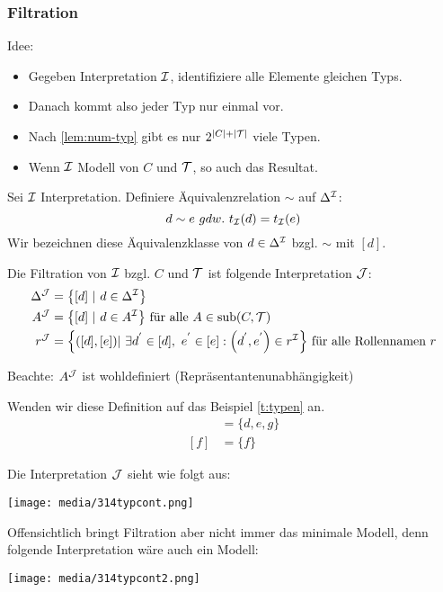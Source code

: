 \subsubsection{Filtration}\label{filtration}
Idee:

\begin{itemize}
  \item Gegeben Interpretation $\mathcal{I}$, identifiziere alle Elemente gleichen Typs.
  \item Danach kommt also jeder Typ nur einmal vor.
  \item Nach \autoref{lem:num-typ} gibt es nur $2^{|C|+|\mathcal{T}|}$ viele Typen.
  \item Wenn $\mathcal{I}$ Modell von $C$ und $\mathcal{T}$, so auch das Resultat.
\end{itemize}

\begin{definition}[Filtration]

Sei $\mathcal{I}$ Interpretation. Definiere Äquivalenzrelation $\sim$ auf
$\Delta^{\mathcal{I}}$: $$d \sim e\ gdw.\ t_\MI\left( d \right) = t_\MI\left( e \right)$$
Wir bezeichnen diese Äquivalenzklasse von $d \in \Delta^{\mathcal{I}}$ bzgl. $\sim$ mit $\left\lbrack d \right\rbrack$.

Die Filtration von $\mathcal{I}$ bzgl. $C$ und $\mathcal{T}$ ist folgende Interpretation $\mathcal{J}$:
\begin{align*}
    \Delta^{\MJ} &= \left\{ \left\lbrack d \right\rbrack\ |\ d \in \Delta^\MI \right\}\\
    A^{\MJ} &= \left\{ \left\lbrack d \right\rbrack\ |\ d \in A^\MI \right\}
  \text{ für alle }A \in \sub\left( C,\MT \right)\\
  r^{\MJ} &= \left\{ \left( \left\lbrack d \right\rbrack,\left\lbrack e \right\rbrack \right)|\ \exists d^{'} \in \left\lbrack d \right\rbrack,\ e^{'} \in \left\lbrack e \right\rbrack:\left( d^{'},e^{'} \right) \in r^\MI \right\}
  \text{ für alle Rollennamen } r
\end{align*}

Beachte: $A^{\mathcal{J}}$ ist wohldefiniert (Repräsentantenunabhängigkeit)
\end{definition}

\setcounter{tafel}{9}
\begin{tafel} [Fortsetzung]
Wenden wir diese Definition auf das Beispiel \autoref{t:typen} an.
\begin{align*}
    [d]&=\{d,e,g\}\\
    [f]&=\{f\}
\end{align*}

Die Interpretation $\mathcal{J}$ sieht wie folgt aus:

\texttt{[image: media/314typcont.png]}

Offensichtlich bringt Filtration aber nicht immer das minimale Modell, denn folgende Interpretation wäre auch ein Modell:

\texttt{[image: media/314typcont2.png]}
\end{tafel}

